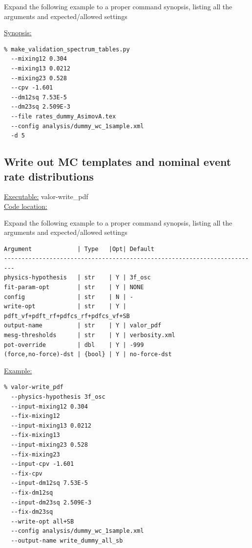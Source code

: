 {\color{red}Expand the following example to a proper command synopsis, 
listing all the arguments and expected/allowed settings}

\underline{Synopsis:}

\begin{verbatim}
% make_validation_spectrum_tables.py 
  --mixing12 0.304 
  --mixing13 0.0212 
  --mixing23 0.528 
  --cpv -1.601 
  --dm12sq 7.53E-5 
  --dm23sq 2.509E-3 
  --file rates_dummy_AsimovA.tex 
  --config analysis/dummy_wc_1sample.xml 
  -d 5
\end{verbatim}

\subsection{
 Write out MC templates and nominal event rate distributions 
}

\underline{Executable:} valor-write_pdf\\

\underline{Code location:} 

{\color{red}Expand the following example to a proper command synopsis, 
listing all the arguments and expected/allowed settings}

\begin{verbatim}
Argument             | Type   |Opt| Default
-------------------------------------------------------------------------
physics-hypothesis   | str    | Y | 3f_osc
fit-param-opt        | str    | Y | NONE
config               | str    | N | -
write-opt            | str    | Y | pdft_vf+pdft_rf+pdfcs_rf+pdfcs_vf+SB
output-name          | str    | Y | valor_pdf
mesg-thresholds      | str    | Y | verbosity.xml
pot-override         | dbl    | Y | -999
(force,no-force)-dst | {bool} | Y | no-force-dst
\end{verbatim}

\underline{Example:}

\begin{verbatim}
% valor-write_pdf 
  --physics-hypothesis 3f_osc 
  --input-mixing12 0.304 
  --fix-mixing12 
  --input-mixing13 0.0212 
  --fix-mixing13 
  --input-mixing23 0.528 
  --fix-mixing23 
  --input-cpv -1.601 
  --fix-cpv 
  --input-dm12sq 7.53E-5 
  --fix-dm12sq 
  --input-dm23sq 2.509E-3 
  --fix-dm23sq 
  --write-opt all+SB 
  --config analysis/dummy_wc_1sample.xml 
  --output-name write_dummy_all_sb
\end{verbatim}

